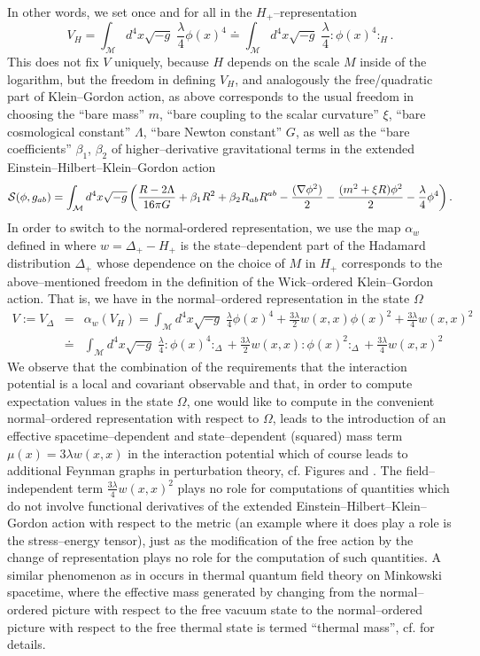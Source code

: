 \documentclass[10pt]{book}
\newcommand{\wick}[1]{:\!{#1}\!:}
\newcommand{\Mcal}{\mathcal{M}}
\theoremstyle{break}
\begin{document}
In other words, we set once and for all in the $H_+$--representation 
$$
V_H=\int_\Mcal d^4x \sqrt{-g} \; \frac{\lambda}{4} \phi(x)^4\doteq \int_\Mcal d^4x \sqrt{-g} \; \frac{\lambda}{4} \wick{\phi(x)^4}_H.
$$
This does not fix $V$ uniquely, because $H$ depends on the scale $M$ inside of the logarithm, but the freedom in defining $V_H$, and analogously the free/quadratic part of Klein--Gordon action, as above corresponds to the usual freedom in choosing the ``bare mass'' $m$, ``bare coupling to the scalar curvature'' $\xi$, ``bare cosmological constant'' $\Lambda$, ``bare Newton constant'' $G$, as well as the ``bare coefficients'' $\beta_1$, $\beta_2$ of higher--derivative gravitational terms in the extended Einstein--Hilbert--Klein--Gordon action
$$
{\cal S}(\phi,g_{ab})=\int_\Mcal d^4x \sqrt{-g}\left(\frac{R-2\Lambda}{16 \pi G}+\beta_1 R^2 + \beta_2 R_{ab}R^{ab}-\frac{(\nabla \phi^2)}{2}-\frac{(m^2+\xi R )\phi^2}{2}-\frac{\lambda}{4}\phi^4\right).
$$
In order to switch to the normal-ordered representation, we use the map $\alpha_{w}$ defined in %
where $w=\Delta_+-H_+$ is the state--dependent part of the Hadamard distribution $\Delta_+$ whose dependence on the choice of $M$ in $H_+$ corresponds to the above--mentioned freedom in the definition of the Wick--ordered Klein--Gordon action. That is, we have in the normal--ordered representation in the state $\Omega$
\begin{eqnarray}
V:=V_\Delta&=&\alpha_w(V_H)=\int_\Mcal d^4x \sqrt{-g} \; \frac{\lambda}{4} \phi(x)^4 + \frac{3\lambda}{2}w(x,x)\phi(x)^2+\frac{3\lambda}{4} w(x,x)^2\\
&\doteq&\int_\Mcal d^4x \sqrt{-g} \; \frac{\lambda}{4} \wick{\phi(x)^4}_\Delta + \frac{3\lambda}{2}w(x,x)\wick{\phi(x)^2}_\Delta+\frac{3\lambda}{4} w(x,x)^2 
\end{eqnarray}
We observe that the combination of the requirements that the interaction potential is a local and covariant observable and that, in order to compute expectation values in the state $\Omega$, one would like to compute in the convenient normal--ordered representation with respect to $\Omega$, leads to the introduction of an effective spacetime--dependent and state--dependent (squared) mass term $\mu(x)=3\lambda w(x,x)$ in the interaction potential which of course leads to additional Feynman graphs in perturbation theory, cf. Figures %
and %
. The field--independent term $\frac{3\lambda}{4} w(x,x)^2$ plays no role for computations of quantities which do not involve functional derivatives of the extended Einstein--Hilbert--Klein--Gordon action with respect to the metric (an example where it does play a role is the stress--energy tensor), just as the modification of the free action by the change of representation plays no role for the computation of such quantities. A similar 
phenomenon as in %
occurs in thermal quantum field theory on Minkowski spacetime, where the effective mass generated by changing from the normal--ordered picture with respect to the free vacuum state to the normal--ordered picture with respect to the free thermal state is termed ``thermal mass'', cf. %
for details.
\end{document}
